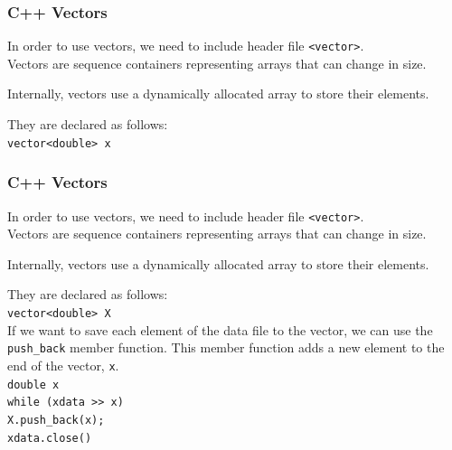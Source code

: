 \documentclass{if-beamer}
\begin{document}
\begin{frame}
\frametitle{C++ Vectors}
In order to use vectors, we need to include header file
\texttt{<vector>}. \\\vspace{10pt}
Vectors are sequence containers representing arrays that can change in size.\\\vspace{10pt}

Internally, vectors use a dynamically allocated array to store their elements. \\\vspace{5pt}

They are declared as follows:
\\\vspace{5pt}
\texttt{vector<double> x}

\end{frame}

\begin{frame}
	\frametitle{C++ Vectors}
	In order to use vectors, we need to include header file
	\texttt{<vector>}. \\\vspace{10pt}
	Vectors are sequence containers representing arrays that can change in size.\\\vspace{10pt}
	
	Internally, vectors use a dynamically allocated array to store their elements. \\\vspace{10pt}
	
	They are declared as follows:
	\\\vspace{10pt}
	\texttt{vector<double> X}\\
	\vspace{10pt}
	If we want to save each element of the data file to the vector, we can use the \texttt{push\_back} member function. This member function adds a new element to the end of the vector, \texttt{x}.
	\\\vspace{10pt}
	\texttt{double x}\\
	\texttt{while (xdata >> x) }\\
	\texttt{\qquad X.push\_back(x);}\\
	\texttt{xdata.close()}\\
\end{frame}
\end{document}
